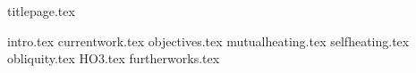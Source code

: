 \documentclass[twoside, twocolumn]{article}
\begin{document}
{titlepage.tex}

{intro.tex}
{currentwork.tex}
{objectives.tex}
{mutualheating.tex}
{selfheating.tex}
{obliquity.tex}
{HO3.tex}
{furtherworks.tex}

\nocite{*}\printbibliography[heading=bibintoc, title={References}]
\end{document}
